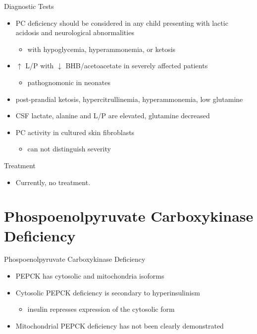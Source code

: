 \documentclass[presentation, smaller]{beamer}
\begin{document}
\begin{frame}[label={sec:org50c4914}]{Diagnostic Tests}
\begin{itemize}
\item PC deficiency should be considered in any child presenting with lactic acidosis and neurological abnormalities
\begin{itemize}
\item with hypoglycemia, hyperammonemia, or ketosis
\end{itemize}

\item \(\uparrow\) L/P with \(\downarrow\) BHB/acetoacetate  in severely affected patients
\begin{itemize}
\item pathognomonic in neonates
\end{itemize}

\item post-prandial ketosis, hypercitrullinemia, hyperammonemia, low glutamine

\item CSF lactate, alanine and L/P are elevated, glutamine decreased

\item PC activity in cultured skin fibroblasts
\begin{itemize}
\item can not distinguish severity
\end{itemize}
\end{itemize}
\end{frame}

\begin{frame}[label={sec:org8444f41}]{Treatment}
\begin{itemize}
\item Currently, no treatment.
\end{itemize}
\end{frame}

\section{Phospoenolpyruvate Carboxykinase Deficiency}
\label{sec:org6ee3676}
\begin{frame}[label={sec:orga750fbc}]{Phospoenolpyruvate Carboxykinase Deficiency}
\begin{itemize}
\item PEPCK has cytosolic and mitochondria isoforms
\item Cytosolic PEPCK deficiency is secondary to hyperinsulinism
\begin{itemize}
\item insulin represses expression of the cytosolic form
\end{itemize}
\item Mitochondrial PEPCK deficiency has not been clearly demonstrated
\end{itemize}
\end{frame}
\end{document}
